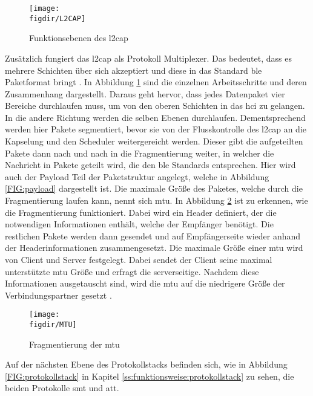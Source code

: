 \begin{figure}[h]
	\centering
	\texttt{[image: \\figdir/L2CAP]}
	\caption{Funktionsebenen des \ac{l2cap} \cite{TI:WWW}}
	\label{FIG:l2cap}
\end{figure}

\noindent Zusätzlich fungiert das \ac{l2cap} als Protokoll Multiplexer. Das bedeutet, dass es mehrere Schichten über sich akzeptiert und diese in das Standard \ac{ble} Paketformat bringt \cite[Seite 25]{Townsend14:GSB}. In Abbildung \ref{FIG:l2cap} sind die einzelnen Arbeitsschritte und deren Zusammenhang dargestellt. Daraus geht hervor, dass jedes Datenpaket vier Bereiche durchlaufen muss, um von den oberen Schichten in das \ac{hci} zu gelangen. In die andere Richtung werden die selben Ebenen durchlaufen. Dementsprechend werden hier Pakete segmentiert, bevor sie von der Flusskontrolle des \ac{l2cap} an die Kapselung und den Scheduler weitergereicht werden. Dieser gibt die aufgeteilten Pakete dann nach und nach in die Fragmentierung weiter, in welcher die Nachricht in Pakete geteilt wird, die den \ac{ble} Standards entsprechen. Hier wird auch der Payload Teil der Paketstruktur angelegt, welche in Abbildung \ref{FIG:payload} dargestellt ist. Die maximale Größe des Paketes, welche durch die Fragmentierung laufen kann, nennt sich \ac{mtu}. In Abbildung \ref{FIG:mtu} ist zu erkennen, wie die Fragmentierung funktioniert. Dabei wird ein Header definiert, der die notwendigen Informationen enthält, welche der Empfänger benötigt. Die restlichen Pakete werden dann gesendet und auf Empfängerseite wieder anhand der Headerinformationen zusammengesetzt. Die maximale Größe einer \ac{mtu} wird von Client und Server festgelegt. Dabei sendet der Client seine maximal unterstützte \ac{mtu} Größe und erfragt die serverseitige. Nachdem diese Informationen ausgetauscht sind, wird die \ac{mtu} auf die niedrigere Größe der Verbindungspartner gesetzt \cite{TI:WWW}.\\ 

\begin{figure}[h]
	\centering
	\texttt{[image: \\figdir/MTU]}
	\caption{Fragmentierung der \ac{mtu} \cite{TI:WWW}}
	\label{FIG:mtu}
\end{figure}

\noindent Auf der nächsten Ebene des Protokollstacks befinden sich, wie in Abbildung \ref{FIG:protokollstack} in Kapitel \ref{ss:funktionsweise:protokollstack} zu sehen, die beiden Protokolle \ac{smt} und \ac{att}.\\

